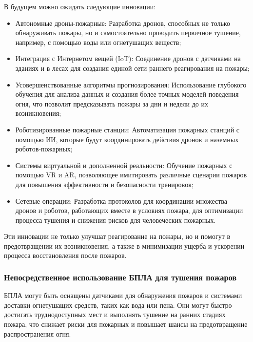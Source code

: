 В будущем можно ожидать следующие инновации:
\begin{itemize}
	\item Автономные дроны-пожарные: Разработка дронов, способных не только обнаруживать пожары, но и самостоятельно проводить первичное тушение, например, с помощью воды или огнетушащих веществ;
	\item Интеграция с Интернетом вещей (IoT): Соединение дронов с датчиками на зданиях и в лесах для создания единой сети раннего реагирования на пожары;
	\item Усовершенствованные алгоритмы прогнозирования: Использование глубокого обучения для анализа данных и создания более точных моделей поведения огня, что позволит предсказывать пожары за дни и недели до их возникновения;
	\item Роботизированные пожарные станции: Автоматизация пожарных станций с помощью ИИ, которые будут координировать действия дронов и наземных роботов-пожарных;
	\item Системы виртуальной и дополненной реальности: Обучение пожарных с помощью VR и AR, позволяющее имитировать различные сценарии пожаров для повышения эффективности и безопасности тренировок;
	\item Сетевые операции: Разработка протоколов для координации множества дронов и роботов, работающих вместе в условиях пожара, для оптимизации процесса тушения и снижения рисков для человеческих пожарных.
\end{itemize}

Эти инновации не только улучшат реагирование на пожары, но и помогут в предотвращении их возникновения, а также в минимизации ущерба и ускорении процесса восстановления после пожаров.
\subsubsection{Непосредственное использование БПЛА для тушения пожаров}

БПЛА могут быть оснащены датчиками для обнаружения пожаров и системами доставки огнетушащих средств, таких как вода или пена. Они могут быстро достигать труднодоступных мест и выполнять тушение на ранних стадиях пожара, что снижает риски для пожарных и повышает шансы на предотвращение распространения огня.

